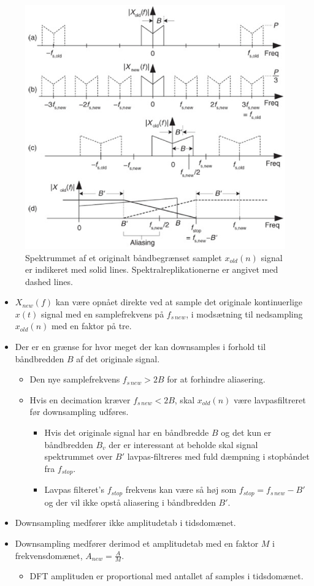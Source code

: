 \documentclass[danish]{article}
\begin{document}
\begin{figure}[H]
	\centering
	\includegraphics[width=0.6\linewidth]{graphics/decimation1}
	\caption{Spektrummet af et originalt båndbegrænset samplet $x_{old}(n)$ signal er indikeret med solid lines. Spektralreplikationerne er angivet med dashed lines.}
	\label{fig:decimation1}
\end{figure}

\begin{itemize}
	\item $X_{new}(f)$ kan være opnået direkte ved at sample det originale kontinuerlige $x(t)$ signal med en samplefrekvens på $f_{s\, new}$, i modsætning til nedsampling $x_{old}(n)$ med en faktor på tre.
	\item Der er en grænse for hvor meget der kan downsamples i forhold til båndbredden $B$ af det originale signal.
	\begin{itemize}
		\item 	Den nye samplefrekvens $f_{s\, new} > 2B$ for at forhindre aliasering.
		\item Hvis en decimation kræver $f_{s\, new} < 2B$, skal $x_{old}(n)$ være lavpasfiltreret før downsampling udføres.
		\begin{itemize}
			\item Hvis det originale signal har en båndbredde $B$ og det kun er båndbredden $B_v$ der er interessant at beholde skal signal spektrummet over $B'$ lavpas-filtreres med fuld dæmpning i stopbåndet fra $f_{stop}$.
			\item  Lavpas filteret's $f_{stop}$ frekvens kan være så høj som $f_{stop} = f_{s\,new} -B'$ og der vil ikke opstå aliasering i båndbredden $B'$.
		\end{itemize}
	\end{itemize}
		\item Downsampling medfører ikke amplitudetab i tidsdomænet.
		\item Downsampling medfører derimod et amplitudetab med en faktor $M$ i frekvensdomænet, $A_{new} = \frac{A}{M}$.
		\begin{itemize}
			\item DFT amplituden er proportional med antallet af samples i tidsdomænet.
		\end{itemize}
\end{itemize}
\end{document}
